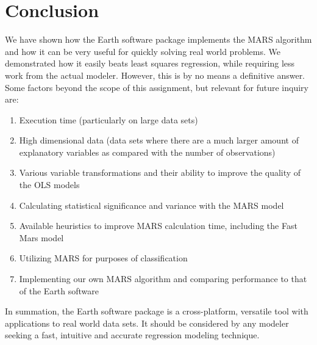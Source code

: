 

\graphicspath{{C:/Documents and Settings/amcelhinney/My Documents/GitHub/MCS507ProjectTwo/tex/include/}}

\section{Conclusion} %
We have shown how the Earth software package implements the MARS algorithm and how it can be very useful for quickly solving real world problems. We demonstrated how it easily beats least squares regression, while requiring less work from the actual modeler. However, this is by no means a definitive answer. Some factors beyond the scope of this assignment, but relevant for future inquiry are:
\begin{enumerate}
\item Execution time (particularly on large data sets)
\item High dimensional data (data sets where there are a much larger amount of explanatory variables as compared with the number of observations)
\item Various variable transformations and their ability to improve the quality of the OLS models
\item Calculating statistical significance and variance with the MARS model
\item Available heuristics to improve MARS calculation time, including the Fast Mars model
\item Utilizing MARS for purposes of classification 
\item Implementing our own MARS algorithm and comparing performance to that of the Earth software
\end{enumerate}

In summation, the Earth software package is a cross-platform, versatile tool with applications to real world data sets. It should be considered by any modeler seeking a fast, intuitive and accurate regression modeling technique.